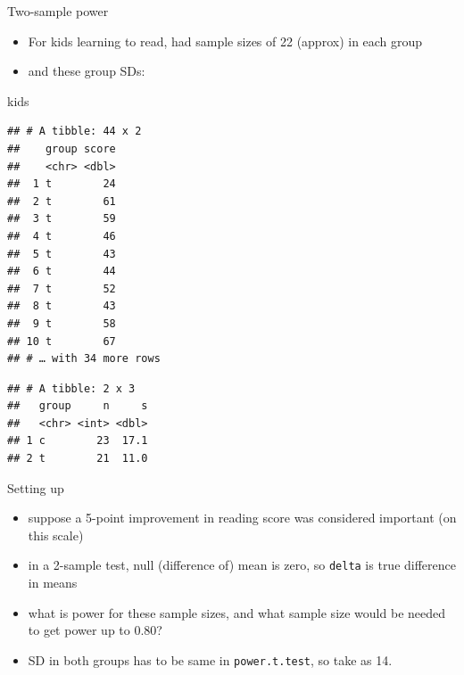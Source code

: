 \documentclass[ignorenonframetext,]{beamer}
\newenvironment{Shaded}{\begin{snugshade}}{\end{snugshade}}
\newcommand{\DataTypeTok}[1]{\textcolor[rgb]{0.13,0.29,0.53}{#1}}
\newcommand{\KeywordTok}[1]{\textcolor[rgb]{0.13,0.29,0.53}{\textbf{#1}}}
\newcommand{\NormalTok}[1]{#1}
\newcommand{\OperatorTok}[1]{\textcolor[rgb]{0.81,0.36,0.00}{\textbf{#1}}}
\newcommand{\StringTok}[1]{\textcolor[rgb]{0.31,0.60,0.02}{#1}}
\providecommand{\tightlist}{%
  \setlength{\itemsep}{0pt}\setlength{\parskip}{0pt}}
\begin{document}
\begin{frame}[fragile]{Two-sample power}
\protect\hypertarget{two-sample-power}{}

\begin{itemize}
\tightlist
\item
  For kids learning to read, had sample sizes of 22 (approx) in each
  group
\item
  and these group SDs:
\end{itemize}

\begin{Shaded}
\begin{Highlighting}[]
\NormalTok{kids}
\end{Highlighting}
\end{Shaded}

\begin{verbatim}
## # A tibble: 44 x 2
##    group score
##    <chr> <dbl>
##  1 t        24
##  2 t        61
##  3 t        59
##  4 t        46
##  5 t        43
##  6 t        44
##  7 t        52
##  8 t        43
##  9 t        58
## 10 t        67
## # … with 34 more rows
\end{verbatim}

\begin{Shaded}
\end{Shaded}

\begin{verbatim}
## # A tibble: 2 x 3
##   group     n     s
##   <chr> <int> <dbl>
## 1 c        23  17.1
## 2 t        21  11.0
\end{verbatim}

\end{frame}

\begin{frame}[fragile]{Setting up}
\protect\hypertarget{setting-up}{}

\begin{itemize}
\tightlist
\item
  suppose a 5-point improvement in reading score was considered
  important (on this scale)
\item
  in a 2-sample test, null (difference of) mean is zero, so
  \texttt{delta} is true difference in means
\item
  what is power for these sample sizes, and what sample size would be
  needed to get power up to 0.80?
\item
  SD in both groups has to be same in \texttt{power.t.test}, so take as
  14.
\end{itemize}

\end{frame}
\end{document}
